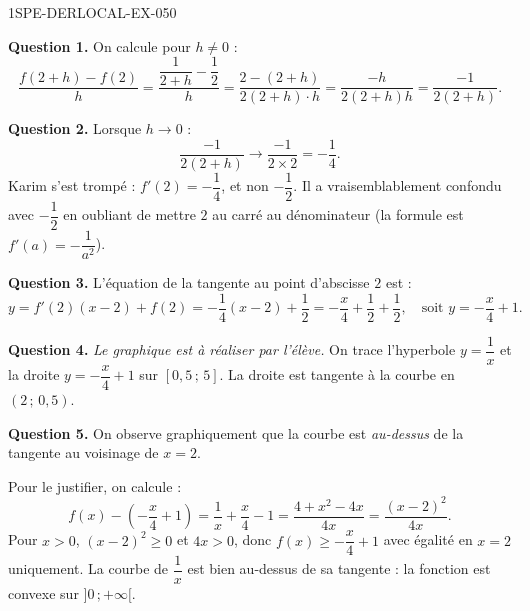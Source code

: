 \begin{corrige}{1SPE-DERLOCAL-EX-050}

\textbf{Question 1.} On calcule pour $h
\neq 0$ :
\[
\frac{f(2+h) - f(2)}{h} = \frac{\dfrac{1}{2+h} - \dfrac{1}{2}}{h} = \frac{2 - (2+h)}{2(2+h) \cdot h} = \frac{-h}{2(2+h)h} = \boxed{\frac{-1}{2(2+h)}}.
\]

\textbf{Question 2.} Lorsque $h \to 0$ :
\[
\frac{-1}{2(2+h)} \to \frac{-1}{2 \times 2} = -\frac{1}{4}.
\]
Karim s'est trompé : $\boxed{f'(2) = -\dfrac{1}{4}}$, et non $-\dfrac{1}{2}$. Il a vraisemblablement confondu avec $-\dfrac{1}{2}$ en oubliant de mettre $2$ au carré au dénominateur (la formule est $f'(a) = -\dfrac{1}{a^2}$).

\textbf{Question 3.} L'équation de la tangente au point d'abscisse $2$ est :
\[
y = f'(2)(x - 2) + f(2) = -\frac{1}{4}(x - 2) + \frac{1}{2} = -\frac{x}{4} + \frac{1}{2} + \frac{1}{2}, \quad \text{soit } \boxed{y = -\frac{x}{4} + 1}.
\]

\textbf{Question 4.} \emph{Le graphique est à réaliser par l'élève.} On trace l'hyperbole $y = \dfrac{1}{x}$ et la droite $y = -\dfrac{x}{4} + 1$ sur $[0{,}5\,;\,5]$. La droite est tangente à la courbe en $(2\,;\,0{,}5)$.

\textbf{Question 5.} On observe graphiquement que la courbe est \emph{au-dessus} de la tangente au voisinage de $x = 2$.

Pour le justifier, on calcule :
\[
f(x) - \left(-\frac{x}{4} + 1\right) = \frac{1}{x} + \frac{x}{4} - 1 = \frac{4 + x^2 - 4x}{4x} = \frac{(x-2)^2}{4x}.
\]
Pour $x > 0$, $(x-2)^2 \geqslant 0$ et $4x > 0$, donc $f(x) \geqslant -\dfrac{x}{4} + 1$ avec égalité en $x = 2$ uniquement. La courbe de $\dfrac{1}{x}$ est bien au-dessus de sa tangente : la fonction est convexe sur $]0\,;+\infty[$.

\end{corrige}
